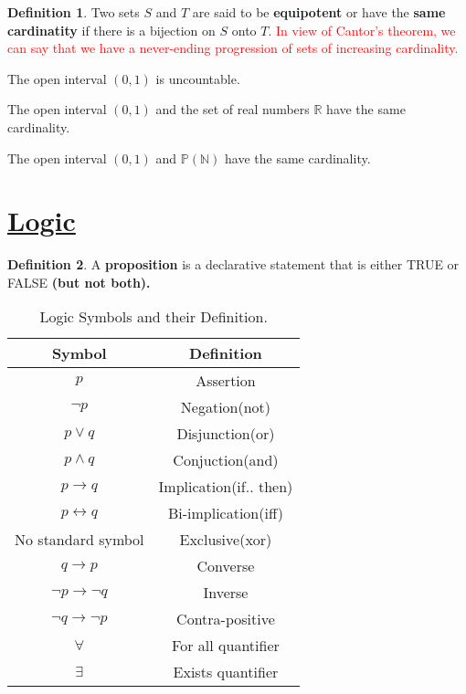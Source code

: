 \documentclass{article}
\theoremstyle{definition}
\newtheorem*{defi}{Definition}
\theoremstyle{definition}
\newenvironment{manualcoro}[1]{%
  \renewcommand\themanualcoroinner{#1}%
  \manualcoroinner
}{\endmanualcoroinner}
\theoremstyle{named}
\begin{document}
\begin{defi}
    Two sets $S$ and $T$ are said to be \textbf{equipotent} or have the \textbf{same cardinatity} if there is a bijection on $S$ onto $T$. \textcolor{red}{In view of Cantor's theorem, we can say that we have a never-ending progression of sets of increasing cardinality. }
\end{defi}

\begin{manualcoro}{5.2}
    The open interval $(0, 1)$ is uncountable.
\end{manualcoro}

\begin{manualcoro}{5.3}
    The open interval $(0, 1)$ and the set of real numbers $\mathbb{R}$ have the same cardinality.
\end{manualcoro}

\begin{manualcoro}{5.4}
    The open interval $(0, 1)$ and  $\mathbb{P}(\mathbb{N})$ have the same cardinality.
\end{manualcoro}


\section{\underline{Logic}}

\begin{defi}
    A \textbf{proposition} is a declarative
statement that is either TRUE or FALSE \textbf{(but not
both).}
\end{defi}

\begin{table}[!ht]
\begin{center}
\centering
    \begin{tabular}[t]{|c|c|}
        \hline Symbol & Definition \\ \hline 
         $p$  & Assertion \\
         $\neg p$ & Negation(not) \\ 
         $p \lor q$ & Disjunction(or) \\ 
         $p \land q$ & Conjuction(and) \\
         $p \rightarrow q$ & Implication(if.. then) \\
         $p \leftrightarrow q$ & Bi-implication(iff) \\
         No standard symbol & Exclusive(xor) \\
         $q \rightarrow p$ & Converse \\
         $\neg p \rightarrow \neg q$ & Inverse \\
         $\neg q \rightarrow \neg p$ & Contra-positive \\
         $\forall$ & For all quantifier \\
         $\exists$ & Exists quantifier \\
         \hline
         
    \end{tabular}
    \caption{\label{abc}Logic Symbols and their Definition.}
\end{center}
\end{table}
\end{document}
